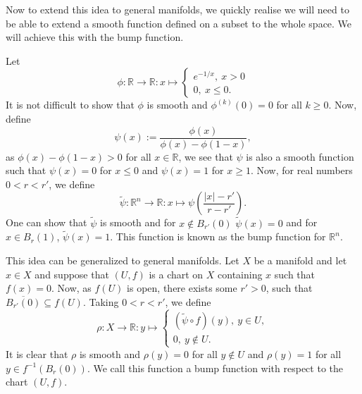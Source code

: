 \documentclass[]{article}
\theoremstyle{definition}
\theoremstyle{definition}
\begin{document}
Now to extend this idea to general manifolds, we quickly realise we will 
need to be able to extend a smooth function defined on a subset to the 
whole space. We will achieve this with the bump function.

Let 
\[\phi : \mathbb{R} \to \mathbb{R} : x \mapsto 
  \begin{cases}
  e^{- 1 / x}, \ x > 0\\
  0, \ x \le 0.
\end{cases}\]
It is not difficult to show that \(\phi\) is smooth and \(\phi^(k)(0) = 0\) 
for all \(k \ge 0\). Now, define 
\[\psi(x) := \frac{\phi(x)}{\phi(x) - \phi(1 - x)},\]
as \(\phi(x) - \phi(1 - x) > 0\) for all \(x \in \mathbb{R}\), we see that 
\(\psi\) is also a smooth function such that \(\psi(x) = 0\) for \(x \le 0\) 
and \(\psi(x) = 1\) for \(x \ge 1\). Now, for real numbers \(0 < r < r'\), 
we define 
\[\tilde \psi : \mathbb{R}^n \to \mathbb{R} : x \mapsto 
  \psi\left(\frac{|x| - r'}{r - r'}\right).\]
One can show that \(\tilde \psi\) is smooth and for \(x \not\in B_{r'}(0)\) 
\(\tilde \psi(x) = 0\) and for \(x \in B_{r}(1)\), \(\tilde \psi(x) = 1\). 
This function is known as the bump function for \(\mathbb{R}^n\). 

This idea can be generalized to general manifolds. Let \(X\) be a manifold and 
let \(x \in X\) and suppose that \((U, f)\) is a chart on \(X\) containing 
\(x\) such that \(f(x) = 0\). Now, as \(f(U)\) is open, there exists some 
\(r' > 0\), such that \(\overline{B_{r'}(0)} \subseteq f(U)\). Taking 
\(0 < r < r'\), we define 
\[\rho : X \to \mathbb{R} : y \mapsto 
  \begin{cases}
    (\tilde \psi \circ f)(y), \ y \in U,\\
    0, \ y \not\in U.
  \end{cases}\]
It is clear that \(\rho\) is smooth and \(\rho(y) = 0\) for all 
\(y \not\in U\) and \(\rho(y) = 1\) for all \(y \in f^{-1}(B_r(0))\).
We call this function a bump function with respect to the chart \((U, f)\).
\end{document}
